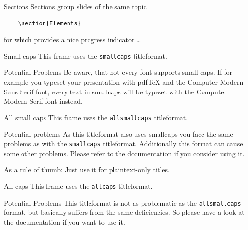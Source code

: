 \begin{frame}[fragile]{Sections}
  Sections group slides of the same topic

  \begin{verbatim}    \section{Elements}\end{verbatim}

  for which \themename provides a nice progress indicator \ldots
  
\end{frame}

{
\begin{frame}{Small caps}
	This frame uses the \texttt{smallcaps} titleformat.

	\begin{alertblock}{Potential Problems}
		Be aware, that not every font supports small caps. If for example you typeset your presentation with pdfTeX and the Computer Modern Sans Serif font, every text in smallcaps will be typeset with the Computer Modern Serif font instead.
	\end{alertblock}
\end{frame}
}

{
\begin{frame}{All small caps}
	This frame uses the \texttt{allsmallcaps} titleformat.

	\begin{alertblock}{Potential problems}
		As this titleformat also uses smallcaps you face the same problems as with the \texttt{smallcaps} titleformat. Additionally this format can cause some other problems. Please refer to the documentation if you consider using it.

		As a rule of thumb: Just use it for plaintext-only titles.
	\end{alertblock}
\end{frame}
}

{
\begin{frame}{All caps}
	This frame uses the \texttt{allcaps} titleformat.

	\begin{alertblock}{Potential Problems}
		This titleformat is not as problematic as the \texttt{allsmallcaps} format, but basically suffers from the same deficiencies. So please have a look at the documentation if you want to use it.
	\end{alertblock}
\end{frame}
}


